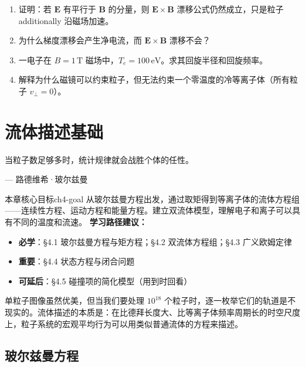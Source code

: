\documentclass[12pt,a4paper,openany,oneside]{book}
\newcommand{\vect}[1]{\bm{#1}}
\newcommand{\difficulty}[1]{\marginnote{\textcolor{red}{\textbf{[#1]}}}}
\begin{document}
\begin{miniquiz}
\begin{enumerate}
\item 证明：若 $\vect{E}$ 有平行于 $\vect{B}$ 的分量，则 $\vect{E}\times\vect{B}$ 漂移公式仍然成立，只是粒子 additionally 沿磁场加速。
\item 为什么梯度漂移会产生净电流，而 $\vect{E}\times\vect{B}$ 漂移不会？
\item 一电子在 $B=1\,\mathrm{T}$ 磁场中，$T_e=100\,\mathrm{eV}$。求其回旋半径和回旋频率。
\item 解释为什么磁镜可以约束粒子，但无法约束一个零温度的冷等离子体（所有粒子 $v_\perp=0$）。
\end{enumerate}
\end{miniquiz}



\chapter{流体描述基础}
\epigraph{当粒子数足够多时，统计规律就会战胜个体的任性。}{--- 路德维希·玻尔兹曼}

\begin{insight}{本章核心目标}{ch4-goal}
从玻尔兹曼方程出发，通过取矩得到等离子体的流体方程组——连续性方程、运动方程和能量方程。建立双流体模型，理解电子和离子可以具有不同的温度和流速。
\tcblower
\textbf{学习路径建议：}

\begin{itemize}[leftmargin=*]
\item[\textcolor{red}{$\blacksquare$}] \textbf{必学}：\S4.1 玻尔兹曼方程与矩方程；\S4.2 双流体方程组；\S4.3 广义欧姆定律
\item[\textcolor{orange}{$\blacksquare$}] \textbf{重要}：\S4.4 状态方程与闭合问题
\item[\textcolor{green}{$\blacksquare$}] \textbf{可延后}：\S4.5 碰撞项的简化模型（用到时回看）
\end{itemize}
\end{insight}

单粒子图像虽然优美，但当我们要处理 $10^{18}$ 个粒子时，逐一枚举它们的轨道是不现实的。流体描述的本质是：在比德拜长度大、比等离子体频率周期长的时空尺度上，粒子系统的宏观平均行为可以用类似普通流体的方程来描述。

\section{玻尔兹曼方程}\difficulty{基础}
\end{document}
